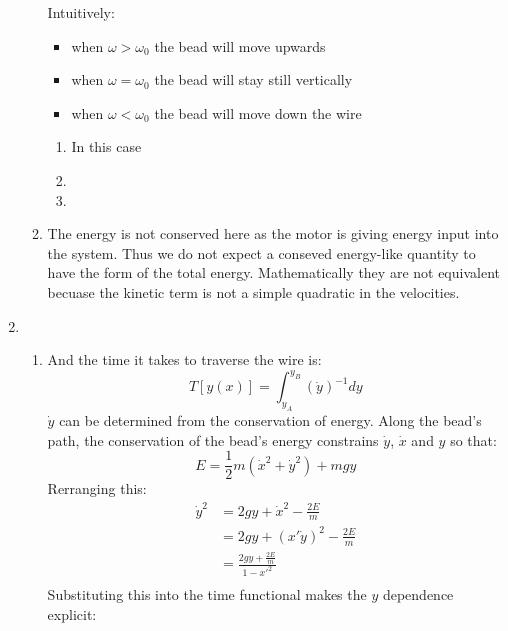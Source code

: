 \documentclass[12pt,a4]{article}
\begin{document}
\begin{enumerate}
\begin{enumerate}
        Intuitively:
        \begin{itemize}
          \item
            when $\omega > \omega_0$ the bead will move upwards
          \item
            when $\omega = \omega_0$ the bead will stay still vertically
          \item
            when $\omega < \omega_0$ the bead will move down the wire
        \end{itemize} 
        \begin{enumerate}

          \item
            In this case
          \item
          \item
        \end{enumerate}
      \item
        The energy is not conserved here as the motor is giving energy input into the system.
        Thus we do not expect a conseved energy-like quantity to have the form of the total energy.
        Mathematically they are not equivalent becuase the kinetic term is not a simple quadratic in the velocities.
    \end{enumerate}
  \item
    \begin{enumerate}
      \item
        And the time it takes to traverse the wire is:
        \begin{equation*}
          T[y(x)] = \int_{y_A}^{y_B} (\dot y)^{-1} dy
        \end{equation*}
        $\dot y$ can be determined from the conservation of energy.
        Along the bead's path, the conservation of the bead's energy constrains $\dot y$, $\dot x$ and $y$ so that:
        \begin{equation*}
          E = \frac{1}{2} m (\dot x^2 + \dot y^2) + m g y
        \end{equation*}
        Rerranging this:
        \begin{align*}
          \dot y^2 &= 2gy + \dot x^2 - \frac{2E}{m}\\
                   &= 2gy + (x'\dot y)^2 - \frac{2E}{m}\\
                   &= \frac{2gy + \frac{2E}{m}}{1 - x'^2}\\
        \end{align*}
        Substituting this into the time functional makes the $y$ dependence explicit:

\end{enumerate}
\end{enumerate}
\end{document}
